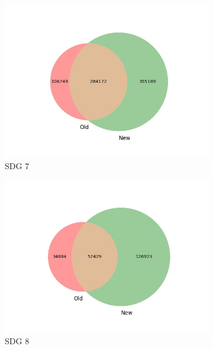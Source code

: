 \documentclass{article}
\begin{document}
\begin{figure}[H]
\begin{subfigure}{0.24\textwidth}
        \includegraphics[width=\textwidth]{figures/aurora-elsevier-venn/venn_sdg_7.jpg}
	    \caption{SDG 7}
    \end{subfigure}
    \hfill
    \begin{subfigure}{0.24\textwidth}
        \centering
        \includegraphics[width=\textwidth]{figures/aurora-elsevier-venn/venn_sdg_8.jpg}
	    \caption{SDG 8}
    \end{subfigure}
        \begin{subfigure}{0.24\textwidth}
        \centering

\end{subfigure}
\end{figure}
\end{document}
